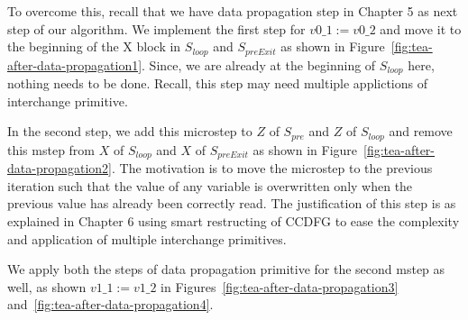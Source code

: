 To overcome this, recall that we have data propagation step in Chapter 5 as next step of our algorithm. We implement the first step for $v0\_1 := v0\_2$ 
and move it to the beginning of the X block in $S_{loop}$ and $S_{preExit}$ as shown in Figure~\ref{fig:tea-after-data-propagation1}. Since, we are already at the beginning of $S_{loop}$ here, nothing needs to be done. Recall, this step may need multiple applictions of interchange primitive. 

In the second step, we add this microstep to $Z$ of $S_{pre}$ and $Z$ of $S_{loop}$ and remove this mstep from $X$ of $S_{loop}$ and $X$ of $S_{preExit}$ as shown in Figure~\ref{fig:tea-after-data-propagation2}. The motivation is to move the microstep to the previous iteration such that the value of any variable is overwritten only when the previous value has already been correctly read. The justification of this step is as explained in Chapter 6 using smart restructing of CCDFG to ease the complexity and application of multiple interchange primitives. 

We apply both the steps of data propagation primitive for the second mstep as well, as shown $v1\_1 := v1\_2$ in Figures~\ref{fig:tea-after-data-propagation3} and~\ref{fig:tea-after-data-propagation4}.

